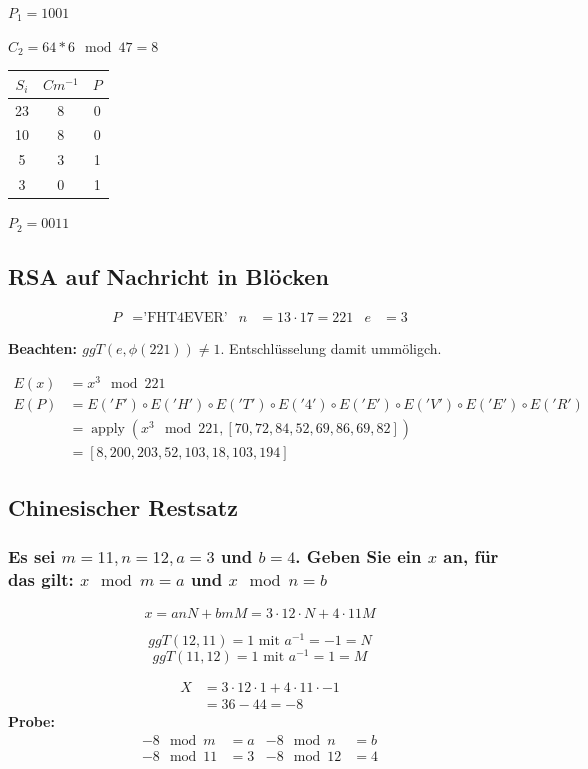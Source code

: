 $P_1 = 1001$

$C_2= 64 * 6 \mod 47 = 8$


\begin{tabular}{ccc}
 $S_i$ & $Cm^{-1}$ & $P$ \\ \hline
 23    & 8  & 0  \\
 10    & 8  & 0  \\
 5     & 3  & 1  \\
 3     & 0   & 1  
\end{tabular}

$P_2 = 0011$

\subsection{RSA auf Nachricht in Blöcken}
\begin{align}
  P &= \text{'FHT4EVER'}  &  n &= 13 \cdot 17 = 221 & e &= 3
\end{align}


\textbf{Beachten: $ggT(e, \phi(221) ) \ne 1$}. Entschlüsselung damit ummöligch.

\begin{align}
	E(x) &=  x^3 \mod 221 \\
	E(P) &=  E('F') \circ E('H')\circ E('T')\circ E('4')\circ E('E')\circ E('V')\circ E('E')\circ E('R')\\
		 &=  \operatorname{apply}(x^3 \mod 221 ,[70, 72, 84, 52, 69, 86, 69, 82])    \\
		 &=  [8, 200, 203, 52, 103, 18, 103, 194]
\end{align}



\subsection{Chinesischer Restsatz}
\subsubsection{Es sei $m = 11, n = 12, a = 3$ und $b = 4$. Geben Sie ein $x$ an, für das gilt: $x \mod m = a$ und $ x \mod n = b$}

\begin{equation}
	x = a n N + b m M  = 3 \cdot 12 \cdot N + 4 \cdot 11 M
\end{equation}

\[ggT(12, 11) = 1 \text{ mit } a^{-1} = -1 = N\]
\[ggT(11, 12) = 1 \text{ mit } a^{-1} =  1 = M\]

\begin{align}
	X &= 3 \cdot 12 \cdot 1 + 4 \cdot 11 \cdot -1 \\
	  &=  36 - 44 = -8
\end{align}
\textbf{Probe:}
\begin{align}
	-8 \mod  m &= a  & -8 \mod  n &= b \\
	-8 \mod 11 &= 3  & -8 \mod 12 &= 4 \\
\end{align}

